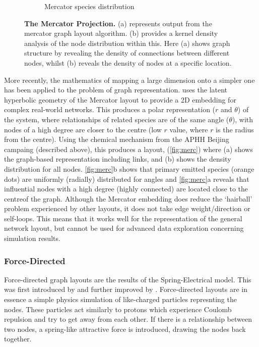 \begin{figure}[H]
\begin{subfigure}[b]{.495\textwidth}
     \caption{Mercator species distribution}
     \end{subfigure}
        \caption{\textbf{The Mercator Projection.} (a) represents output from the mercator graph layout algorithm. (b) provides a kernel density analysis of the node distribution within this. Here (a) shows graph structure by revealing the density of connections between different nodes, whilst (b) reveals the density of nodes at a specific location. }
        \label{fig:merc}
\end{figure}

More recently, the mathematics of mapping a large dimension onto a simpler one has been applied to the problem of graph representation. \citep{mercgraph} uses the latent hyperbolic geometry of the Mercator layout to provide a 2D embedding for complex real-world networks. This produces a polar representation ($r$ and $\theta$) of the system, where relationships of related species are of the same angle ($\theta$), with nodes of a high degree are closer to the centre (low $r$ value, where $r$ is the radius from the centre). Using the chemical mechanism from the APHH  Beijing campaing (described above), this produces a layout, (\autoref{fig:merc}) where (a) shows the graph-based representation including links, and (b) shows the density distribution for all nodes. \autoref{fig:merc}b shows that primary emitted species (orange dots) are uniformly (radially) distributed for angles and \autoref{fig:merc}a reveals that influential nodes with a high degree (highly connected) are located close to the centreof the graph. Although the Mercator embedding does reduce the `hairball' problem experienced by other layouts, it does not take edge weight/direction or self-loops. This means that it works well for the representation of the general network layout, but cannot be used for advanced data exploration concerning simulation results.  



\subsubsection{Force-Directed}\label{sec:forcedirected}

Force-directed graph layouts are the results of the Spring-Electrical model. This was first introduced by \citep{Eades} and further improved by \citep{raingold}. Force-directed layouts are in essence a simple physics simulation of like-charged particles represnting the nodes. These particles act similarly to protons which experience Coulomb repulsion and try to get away from each other. If there is a relationship between two nodes, a spring-like attractive force is introduced, drawing the nodes back together. 

